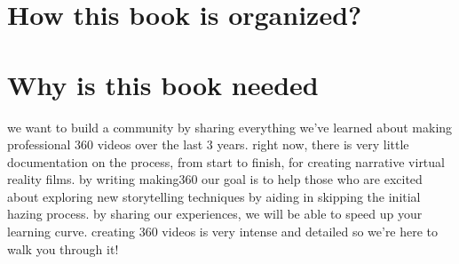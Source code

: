 \section{How this book is organized?}
\begin{fullwidth}
\end{fullwidth}

\section{Why is this book needed}
\begin{fullwidth}

we want to build a community by sharing everything we’ve learned about making professional 360 videos over the last 3 years. right now, there is very little documentation on the process, from start to finish, for creating narrative virtual reality films. by writing making360 our goal is to help those who are excited about exploring new storytelling techniques by aiding in skipping the initial hazing process. by sharing our experiences, we will be able to speed up your learning curve. creating 360 videos is very intense and detailed so we’re here to walk you through it!


\end{fullwidth}
